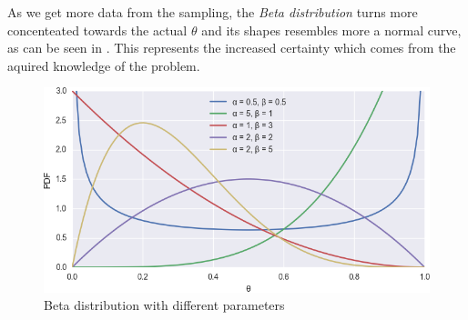 As we get more data from the sampling, the \emph{Beta distribution} turns more concenteated towards the actual \( \theta \) and its shapes resembles more a normal curve, as can be seen in . This represents the increased certainty which comes from the aquired knowledge of the problem.

\begin{figure}[h]
\begin{center}
\includegraphics[width=\textwidth]{figures/beta.png}
\caption{Beta distribution with different parameters}
\end{center}
\label{betagraph}
\end{figure}
